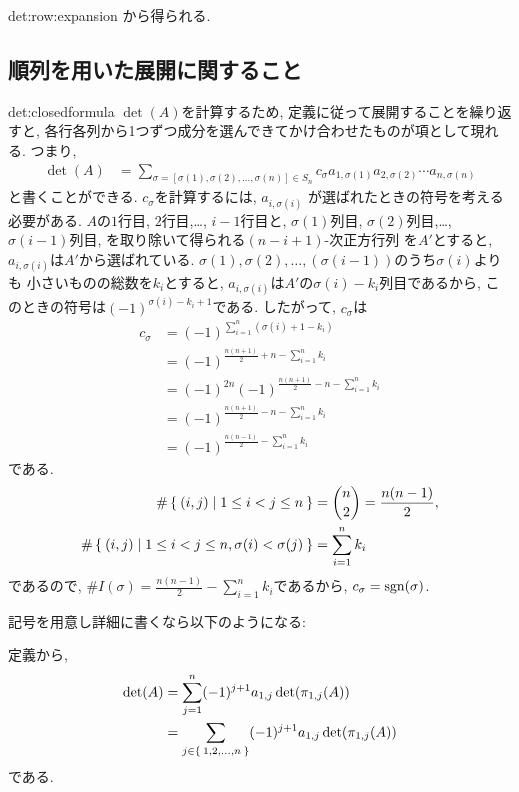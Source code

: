 \begin{proofof}{det:row:expansion}
から得られる.
\end{proofof}

\subsection{順列を用いた展開に関すること}
\begin{proofof}{det:closedformula}
  $\det(A)$を計算するため,
  定義に従って展開することを繰り返すと,
  各行各列から1つずつ成分を選んできてかけ合わせたものが項として現れる.
  つまり,
  \begin{align*}
    \det(A)&=
    \sum_{\sigma=[\sigma(1),\sigma(2),\ldots,\sigma(n)]\in S_n}
    c_{\sigma}
    a_{1,\sigma(1)}a_{2,\sigma(2)}\cdots a_{n,\sigma(n)}
  \end{align*}
  と書くことができる.
  $c_{\sigma}$を計算するには,
  $a_{i,\sigma(i)}$
  が選ばれたときの符号を考える必要がある.
  $A$の$1$行目, $2$行目,\ldots, $i-1$行目と,
  $\sigma(1)$列目, $\sigma(2)$列目,\ldots,$\sigma(i-1)$列目,
  を取り除いて得られる$(n-i+1)$-次正方行列
  を$A'$とすると,
  $a_{i,\sigma(i)}$は$A'$から選ばれている.
  $\sigma(1),\sigma(2),\ldots,(\sigma(i-1))$のうち$\sigma(i)$よりも
  小さいものの総数を$k_i$とすると,
  $a_{i,\sigma(i)}$は$A'$の$\sigma(i)-k_i$列目であるから,
  このときの符号は$(-1)^{\sigma(i)-k_i+1}$である.
  したがって, $c_\sigma$は
  \begin{align*}
    c_\sigma &= (-1)^{\sum_{i=1}^n(\sigma(i)+1-k_i)}\\
    &= (-1)^{\frac{n(n+1)}{2}+n-\sum_{i=1}^n k_i}\\
    &= (-1)^{2n}(-1)^{\frac{n(n+1)}{2}-n-\sum_{i=1}^n k_i}\\
    &= (-1)^{\frac{n(n+1)}{2}-n-\sum_{i=1}^n k_i}\\
    &= (-1)^{\frac{n(n-1)}{2}-\sum_{i=1}^n k_i}
  \end{align*}
  である. 
  \begin{align*}
    \#\Set{(i,j)|1\leq i<j\leq n}&=\binom{n}{2}=\frac{n(n-1)}{2},\\
    \#\Set{(i,j)|1\leq i<j\leq n, \sigma(i)<\sigma(j)}&=\sum_{i=1}^n k_i
  \end{align*}
  であるので,
  $\#I(\sigma)=\frac{n(n-1)}{2}-\sum_{i=1}^n k_i$であるから,
  $c_\sigma=\operatorname{sgn}(\sigma)$.


  記号を用意し詳細に書くなら以下のようになる:
  

  定義から,
  \begin{align*}
    \det(A)
    &=\sum_{j=1}^{n}
    (-1)^{j+1}a_{1,j}\det(\pi_{1,j}(A))\\
    &=\sum_{j\in\Set{1,2,\ldots,n}}
    (-1)^{j+1}a_{1,j}\det(\pi_{1,j}(A))
  \end{align*}
  である. 
  

\end{proofof}
